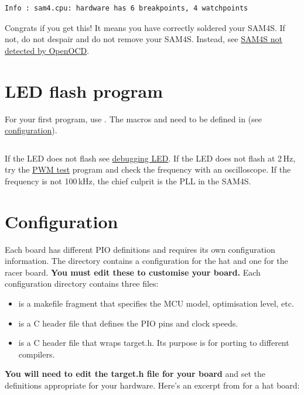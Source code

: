 \begin{verbatim}
Info : sam4.cpu: hardware has 6 breakpoints, 4 watchpoints
\end{verbatim}

Congrats if you get this! It means you have correctly soldered your
SAM4S. If not, do not despair and do not remove your SAM4S. Instead,
see \protect\hyperref[sam4s-not-detected-by-openocd]{SAM4S not
  detected by OpenOCD}.


\section{LED flash program}
\label{led-flash-program}

For your first program, use
. The macros 
and  need to be defined in  (see
\protect\hyperref[configuration]{configuration}).

\inputminted{C}{../../src/test-apps/ledflash1/ledflash1.c}

If the LED does not flash see \hyperref[debugging-LED]{debugging LED}.
If the LED does not flash at 2\,Hz, try the \hyperref[pwm-test]{PWM
  test} program and check the frequency with an oscilloscope.  If the
frequency is not 100\,kHz, the chief culprit is the PLL in the SAM4S.


\section{Configuration}
\label{configuration}

Each board has different PIO definitions and requires its own
configuration information. The  directory contains a
configuration for the hat and one for the racer board.  \textbf{You
must edit these to customise your board.}  Each configuration
directory contains three files:

\begin{itemize}
\item
   is a makefile fragment that specifies the MCU model,
  optimisation level, etc.
\item
   is a C header file that defines the PIO pins and
  clock speeds.
\item
   is a C header file that wraps target.h. Its purpose
  is for porting to different compilers.
\end{itemize}

\textbf{You will need to edit the target.h file for your board} and set
the definitions appropriate for your hardware. Here's an excerpt from
 for a hat board:

